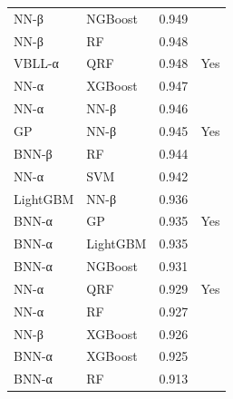\begin{tabular}{llrl}
NN-β & NGBoost & 0.949 &  \\
NN-β & RF & 0.948 &  \\
VBLL-α & QRF & 0.948 & Yes \\
NN-α & XGBoost & 0.947 &  \\
NN-α & NN-β & 0.946 &  \\
GP & NN-β & 0.945 & Yes \\
BNN-β & RF & 0.944 &  \\
NN-α & SVM & 0.942 &  \\
LightGBM & NN-β & 0.936 &  \\
BNN-α & GP & 0.935 & Yes \\
BNN-α & LightGBM & 0.935 &  \\
BNN-α & NGBoost & 0.931 &  \\
NN-α & QRF & 0.929 & Yes \\
NN-α & RF & 0.927 &  \\
NN-β & XGBoost & 0.926 &  \\
BNN-α & XGBoost & 0.925 &  \\
BNN-α & RF & 0.913 &  \\
\bottomrule
\end{tabular}